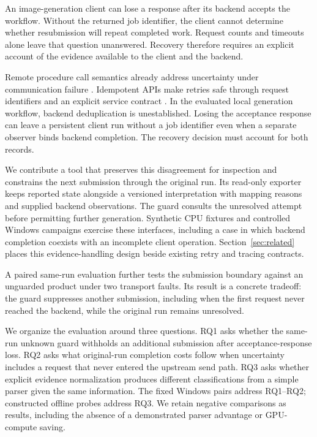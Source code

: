 \documentclass{ieeeaccess}
\begin{document}
An image-generation client can lose a response after its backend accepts the
workflow. Without the returned job identifier, the client cannot determine
whether resubmission will repeat completed work. Request counts and timeouts
alone leave that question unanswered. Recovery therefore requires an explicit
account of the evidence available to the client and the backend.

Remote procedure call semantics already address uncertainty under communication
failure \cite{birrell1984}. Idempotent APIs make retries safe through request
identifiers and an explicit service contract \cite{aws}. In the evaluated local
generation workflow, backend deduplication is unestablished. Losing the acceptance
response can leave a persistent client run without a job identifier even when
a separate observer binds backend completion. The recovery decision must
account for both records.

We contribute a tool that preserves this disagreement for inspection and
constrains the next submission through the original run. Its read-only exporter
keeps reported state alongside a versioned interpretation with mapping reasons
and supplied backend observations. The guard consults the unresolved attempt
before permitting further generation. Synthetic CPU fixtures and controlled
Windows campaigns exercise these interfaces, including a case in which backend
completion coexists with an incomplete client operation. Section~\ref{sec:related}
places this evidence-handling design beside existing retry and tracing contracts.

A paired same-run evaluation further tests the submission boundary against an
unguarded product under two transport faults. Its result is a concrete tradeoff:
the guard suppresses another submission, including when the first request never
reached the backend, while the original run remains unresolved.

We organize the evaluation around three questions. RQ1 asks whether the same-run
unknown guard withholds an additional submission after acceptance-response loss.
RQ2 asks what original-run completion costs follow when uncertainty includes a
request that never entered the upstream send path. RQ3 asks whether explicit
evidence normalization produces different classifications from a simple parser
given the same information. The fixed Windows pairs address RQ1--RQ2; constructed
offline probes address RQ3. We retain negative comparisons as results, including
the absence of a demonstrated parser advantage or GPU-compute saving.
\end{document}
